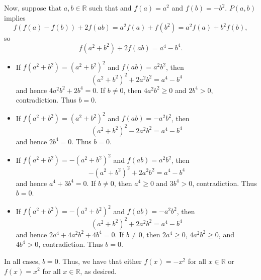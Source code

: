 Now, suppose that $a,b\in\mathbb{R}$ such that and $f\left(a\right)=a^2$ and $f\left(b\right)=-b^2$. $P\left(a,b\right)$ implies \[f\left(f\left(a\right)-f\left(b\right)\right)+2f\left(ab\right)=a^2f\left(a\right)+f\left(b^2\right)=a^2f\left(a\right)+b^2f\left(b\right),\] so \[f\left(a^2+b^2\right)+2f\left(ab\right)=a^4-b^4.\]
\begin{itemize}
	\item If $f\left(a^2+b^2\right)=\left(a^2+b^2\right)^2$ and $f\left(ab\right)=a^2b^2$, then \[\left(a^2+b^2\right)^2+2a^2b^2=a^4-b^4\] and hence $4a^2b^2+2b^4=0$. If $b\neq0$, then $4a^2b^2\geq0$ and $2b^4>0$, contradiction. Thus $b=0$.
	\item If $f\left(a^2+b^2\right)=\left(a^2+b^2\right)^2$ and $f\left(ab\right)=-a^2b^2$, then \[\left(a^2+b^2\right)^2-2a^2b^2=a^4-b^4\] and hence $2b^4=0$. Thus $b=0$.
	\item If $f\left(a^2+b^2\right)=-\left(a^2+b^2\right)^2$ and $f\left(ab\right)=a^2b^2$, then \[-\left(a^2+b^2\right)^2+2a^2b^2=a^4-b^4\] and hence $a^4+3b^4=0$. If $b\neq0$, then $a^4\geq0$ and $3b^4>0$, contradiction. Thus $b=0$.
	\item If $f\left(a^2+b^2\right)=-\left(a^2+b^2\right)^2$ and $f\left(ab\right)=-a^2b^2$, then \[\left(a^2+b^2\right)^2+2a^2b^2=a^4-b^4\] and hence $2a^4+4a^2b^2+4b^4=0$. If $b\neq0$, then $2a^4\geq0$, $4a^2b^2\geq0$, and $4b^4>0$, contradiction. Thus $b=0$.
\end{itemize}
In all cases, $b=0$. Thus, we have that either $f\left(x\right)=-x^2$ for all $x\in\mathbb{R}$ or $f\left(x\right)=x^2$ for all $x\in\mathbb{R}$, as desired.
